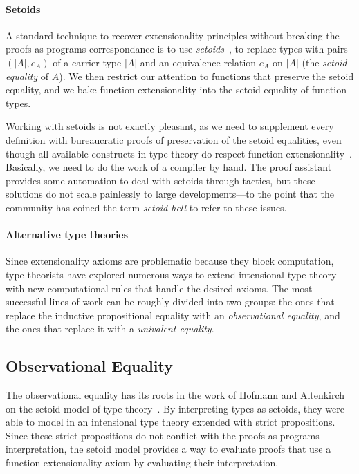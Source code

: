 \paragraph*{Setoids}
% 
A standard technique to recover extensionality principles without breaking the
proofs-as-programs correspondance is to use \emph{setoids}~,
\ie to replace types with pairs \( (|A|, e_A) \) of a carrier type \( |A| \)
and an equivalence relation \( e_A \) on \( |A| \) 
(the \emph{setoid equality} of \( A \)).
% 
We then restrict our attention to functions that preserve the setoid equality, 
and we bake function extensionality into the setoid equality of function types.

Working with setoids is not exactly pleasant, as we need to supplement every
definition with bureaucratic proofs of preservation of the setoid equalities,
even though all available constructs in type theory do respect function 
extensionality~.
% 
Basically, we need to do the work of a compiler by hand.
% 
The \Coq proof assistant provides some automation to deal with setoids through 
tactics, but these solutions do not scale painlessly to large developments---to 
the point that the community has coined the term \emph{setoid hell} to refer 
to these issues.

\paragraph*{Alternative type theories}
% 
Since extensionality axioms are problematic because they block 
computation, type theorists have explored numerous ways to extend intensional
type theory with new computational rules that handle the desired axioms.
% 
The most successful lines of work can be roughly divided into two groups: the 
ones that replace the inductive propositional equality with an \emph{observational equality}, 
and the ones that replace it with a \emph{univalent equality}.
% 

\subsection{Observational Equality}

The observational equality has its roots in the work of Hofmann and 
Altenkirch on the setoid model of type theory~\cite{hofmann95,altenkirch99}.
% 
By interpreting types as setoids, they were able to model
in an intensional type theory extended with strict propositions.
% 
Since these strict propositions do not conflict with the proofs-as-programs 
interpretation, the setoid model provides a way to evaluate proofs that use a 
function extensionality axiom by evaluating their interpretation.


